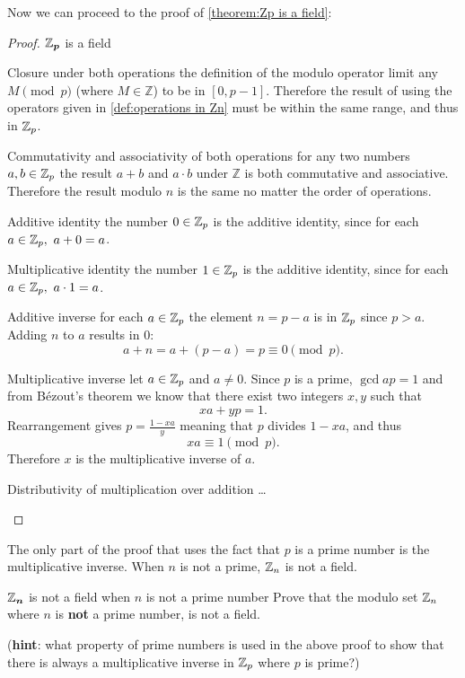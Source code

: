 Now we can proceed to the proof of \autoref{theorem:Zp is a field}:

\begin{proof}{$\bm{\mathbb{Z}_{p}}$ is a field}{}
	\begin{descitemize}
	\item[Closure under both operations] the definition of the modulo operator limit any $M\pmod{p}$ (where $M\in\mathbb{Z}$) to be in $[0,p-1]$. Therefore the result of using the operators given in \autoref{def:operations in Zn} must be within the same range, and thus in $\mathbb{Z}_{p}$.

	\item[Commutativity and associativity of both operations] for any two numbers $a,b\in\mathbb{Z}_{p}$ the result $a+b$ and $a\cdot b$ under $\mathbb{Z}$ is both commutative and associative. Therefore the result modulo $n$ is the same no matter the order of operations.

	\item[Additive identity] the number $0\in\mathbb{Z}_{p}$ is the additive identity, since for each $a\in\mathbb{Z}_{p},\ a+0=a$.
	
	\item[Multiplicative identity] the number $1\in\mathbb{Z}_{p}$ is the additive identity, since for each $a\in\mathbb{Z}_{p},\ a\cdot1=a$.

	\item[Additive inverse] for each $a\in\mathbb{Z}_{p}$ the element $n=p-a$ is in $\mathbb{Z}_{p}$ since $p>a$. Adding $n$ to $a$ results in $0$:
		\[
			a+n = a+(p-a) = p \equiv 0\pmod{p}.
		\]
	
	\item[Multiplicative inverse] let $a\in\mathbb{Z}_{p}$ and $a\neq0$. Since $p$ is a prime, $\gcd{a}{p}=1$ and from B\'ezout's theorem we know that there exist two integers $x,y$ such that
		\[
			xa + yp = 1.
		\]
		Rearrangement gives $p = \frac{1-xa}{y}$ meaning that $p$ divides $1-xa$, and thus
		\[
			xa\equiv1\pmod{p}.
		\]
		Therefore $x$ is the multiplicative inverse of $a$.
	
	\item[Distributivity of multiplication over addition] \ldots
	\end{descitemize}
\end{proof}

The only part of the proof that uses the fact that $p$ is a prime number is the multiplicative inverse. When $n$ is not a prime, $\mathbb{Z}_{n}$ is not a field.

\begin{challange}{$\bm{\mathbb{Z}_{n}}$ is not a field when $n$ is not a prime number}{}
	Prove that the modulo set $\mathbb{Z}_{n}$ where $n$ is \textbf{not} a prime number, is not a field.

	(\textbf{hint}: what property of prime numbers is used in the above proof to show that there is always a multiplicative inverse in $\mathbb{Z}_{p}$ where $p$ is prime?)
\end{challange}
